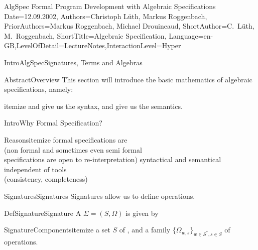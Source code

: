 \documentclass[landscape, slides, light]{mmiss2}
\begin{document}
\begin{Package}{AlgSpec}
{Formal Program Development with Algebraic Specifications}
{Date=12.09.2002,
Authors={Christoph L\"uth, Markus Roggenbach},
PriorAuthors={Markus Roggenbach, Michael Drouineaud},
ShortAuthor={C.~L\"uth, M.~Roggenbach},
ShortTitle={Algebraic Specification},
Language=en-GB,LevelOfDetail=LectureNotes,InteractionLevel=Hyper}

\begin{Section}{IntroAlgSpec}{Signatures, Terms and Algebras}{}



\begin{Abstract}{Abstract}{Overview}{}
This section will introduce the basic mathematics of algebraic
specifications, namely:
\begin{List}{}{itemize}{}
  \ListItem{}  and  give us the syntax,
  \ListItem{} and  give us the semantics.
\end{List}  
\end{Abstract}

\begin{Introduction}{Intro}{Why Formal Specification?}{}
\begin{List}{Reasons}{itemize}{}
\ListItem{}
formal specifications are   \\
(non formal and sometimes even semi formal \\
specifications are open to re-interpretation)\pause
\ListItem{}
syntactical and semantical  \\ 
independent of tools 
\pause
\ListItem{}
 \\
(consistency, completeness)
\end{List}
\end{Introduction}

\begin{Paragraph}{Signatures}{Signatures}{}
Signatures allow us to define operations.

\begin{Definition}{DefSignature}{Signature}{}
A  $\Sigma=(S, \Omega)$ is given by 
\begin{List}{SignatureComponents}{itemize}{}
    \ListItem{} a set $S$ of , and 
    \ListItem{} a family $\{\Omega_{w,s}\}_{w\in S^{*},s\in S}$ of operations. 
  \end{List}
\end{Definition}


\end{Paragraph}
\end{Section}
\end{Package}
\end{document}
